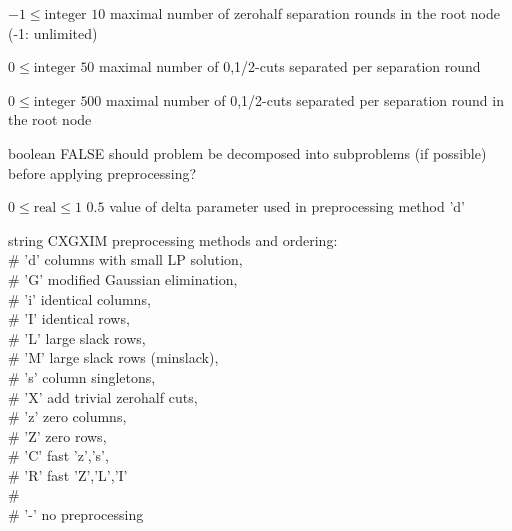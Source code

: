 %
{$-1\leq\textrm{integer}$}%
{$10$}%
{maximal number of zerohalf separation rounds in the root node (-1: unlimited)}%
{}

%
{$0\leq\textrm{integer}$}%
{$50$}%
{maximal number of {0,1/2}-cuts separated per separation round}%
{}

%
{$0\leq\textrm{integer}$}%
{$500$}%
{maximal number of {0,1/2}-cuts separated per separation round in the root node}%
{}

%
{boolean}%
{FALSE}%
{should problem be decomposed into subproblems (if possible) before applying preprocessing?}%
{}

%
{$0\leq\textrm{real}\leq1$}%
{$0.5$}%
{value of delta parameter used in preprocessing method 'd'}%
{}

%
{string}%
{CXGXIM}%
{preprocessing methods and ordering:\\   \#                      'd' columns with small LP solution,\\    \#                      'G' modified Gaussian elimination,\\     \#                      'i' identical columns,\\   \#                      'I' identical rows,\\   \#                      'L' large slack rows,\\   \#                      'M' large slack rows (minslack),\\   \#                      's' column singletons,\\   \#                      'X' add trivial zerohalf cuts,\\   \#                      'z' zero columns,\\   \#                      'Z' zero rows,\\   \#                      'C' fast {'z','s'},\\   \#                      'R' fast {'Z','L','I'}\\   \#                      \\                         \#                      '-' no preprocessing}%
{}

